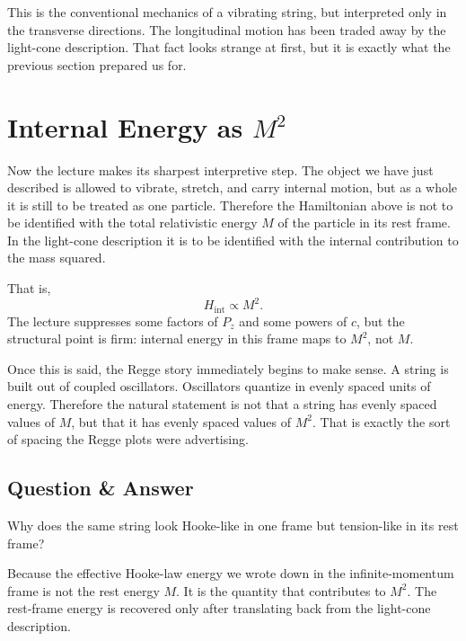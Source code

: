 This is the conventional mechanics of a vibrating string, but interpreted only in the transverse directions. The longitudinal motion has been traded away by the light-cone description. That fact looks strange at first, but it is exactly what the previous section prepared us for.

\section{Internal Energy as \(M^2\)}

Now the lecture makes its sharpest interpretive step. The object we have just described is allowed to vibrate, stretch, and carry internal motion, but as a whole it is still to be treated as one particle. Therefore the Hamiltonian above is not to be identified with the total relativistic energy \(M\) of the particle in its rest frame. In the light-cone description it is to be identified with the internal contribution to the mass squared.

That is,
\begin{equation}
H_{\mathrm{int}} \propto M^2.
\end{equation}
The lecture suppresses some factors of \(P_z\) and some powers of \(c\), but the structural point is firm: internal energy in this frame maps to \(M^2\), not \(M\).

Once this is said, the Regge story immediately begins to make sense. A string is built out of coupled oscillators. Oscillators quantize in evenly spaced units of energy. Therefore the natural statement is not that a string has evenly spaced values of \(M\), but that it has evenly spaced values of \(M^2\). That is exactly the sort of spacing the Regge plots were advertising.

\subsection{Question \& Answer}

Why does the same string look Hooke-like in one frame but tension-like in its rest frame?

Because the effective Hooke-law energy we wrote down in the infinite-momentum frame is not the rest energy \(M\). It is the quantity that contributes to \(M^2\). The rest-frame energy is recovered only after translating back from the light-cone description.

